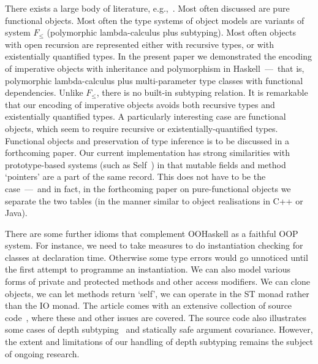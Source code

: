 There exists a large body of literature,
e.g.,~\cite{Poll97,AC96,Ohori95,Remy94a,PT94,BM92}. Most often
discussed are pure functional objects. Most often the type systems of
object models are variants of system $F_{\leq}$ (polymorphic
lambda-calculus plus subtyping). Most often objects with open
recursion are represented either with recursive types, or with
existentially quantified types. In the present paper we demonstrated
the encoding of imperative objects with inheritance and polymorphism
in Haskell~---~that is, polymorphic lambda-calculus plus
multi-parameter type classes with functional dependencies. Unlike
$F_{\leq}$, there is no built-in subtyping relation. It is remarkable
that our encoding of imperative objects avoids both recursive types
and existentially quantified types. A particularly interesting case
are functional objects, which seem to require recursive or
existentially-quantified types. Functional objects and preservation of
type inference is to be discussed in a forthcoming paper.  Our current
implementation has strong similarities with prototype-based systems
(such as Self~\cite{Self}) in that mutable fields and method
`pointers' are a part of the same record. This does not have to be the
case~---~and in fact, in the forthcoming paper on pure-functional
objects we separate the two tables (in the manner similar to object
realisations in C++ or Java).

There are some further idioms that complement OOHaskell as a faithful
OOP system.  For instance, we need to take measures to do
instantiation checking for classes at declaration time. Otherwise some
type errors would go unnoticed until the first attempt to programme an
instantiation. We can also model various forms of private and
protected methods and other access modifiers. We can clone objects, we
can let methods return `self', we can operate in the ST monad rather
than the IO monad. The article comes with an extensive collection of
source code~\cite{OOHaskell}, where these and other issues are
covered. The source code also illustrates some cases of depth
subtyping~\cite{Poll97} and statically safe argument
covariance. However, the extent and limitations of our handling of
depth subtyping remains the subject of ongoing research.

